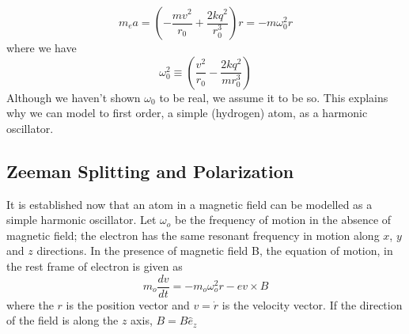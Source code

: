 \[
m_{e}a=\left(-\frac{mv^{2}}{r_{0}}+\frac{2kq^{2}}{r_{0}^{3}}\right)r=-m\omega_{0}^{2}r
\]
where we have 
\[
\omega_{0}^{2}\equiv\left(\frac{v^{2}}{r_{0}}-\frac{2kq^{2}}{mr_{0}^{3}}\right)
\]
Although we haven't shown $\omega_{0}$ to be real, we assume it to
be so. This explains why we can model to first order, a simple (hydrogen)
atom, as a harmonic oscillator.


\subsection{Zeeman Splitting and Polarization}

It is established now that an atom in a magnetic field can be modelled
as a simple harmonic oscillator. Let $\omega_{o}$ be the frequency
of motion in the absence of magnetic field; the electron has the same
resonant frequency in motion along $x$, $y$ and $z$ directions.
In the presence of magnetic field B, the equation of motion, in the
rest frame of electron is given as 
\[
m_{o}\frac{dv}{dt}=-m_{o}\omega_{o}^{2}r-ev\times B
\]
where the $r$ is the position vector and $v=\dot{r}$ is the velocity
vector. If the direction of the field is along the $z$ axis, $B=B\hat{e}_{z}$

